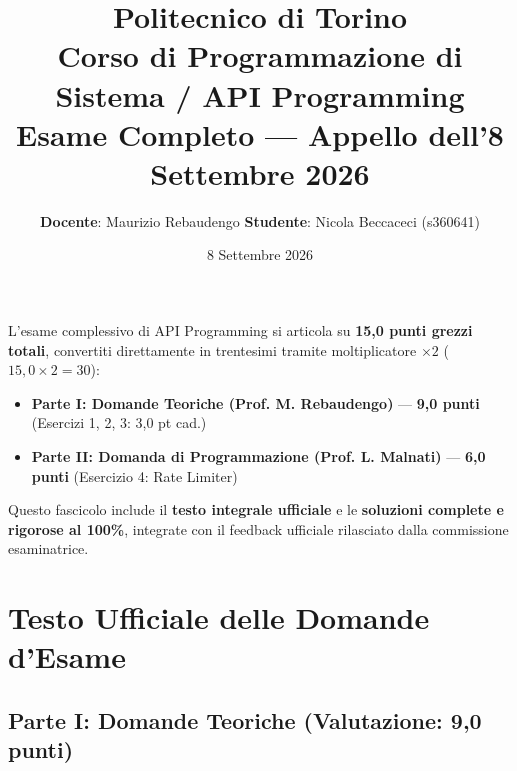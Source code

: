 \documentclass[11pt,a4paper]{article}
\title{\Huge\textbf{Politecnico di Torino}\\[0.3em]
\large Corso di Programmazione di Sistema / API Programming\\[0.5em]
\LARGE\textbf{Esame Completo --- Appello dell'8 Settembre 2026}}
\author{\textbf{Docente}: Maurizio Rebaudengo \quad \textbf{Studente}: Nicola Beccaceci (s360641)}
\date{8 Settembre 2026}
\begin{document}
\maketitle
\thispagestyle{empty}

\begin{tcolorbox}[colback=boxbg,colframe=boxborder,title=\textbf{Riepilogo Ufficiale e Struttura della Valutazione},arc=3mm]
L'esame complessivo di API Programming si articola su \textbf{15,0 punti grezzi totali}, convertiti direttamente in trentesimi tramite moltiplicatore $\times 2$ ($15{,}0 \times 2 = 30$):
\begin{itemize}[leftmargin=1.5em]
    \item \textbf{Parte I: Domande Teoriche (Prof. M. Rebaudengo)} --- \textbf{9,0 punti} (Esercizi 1, 2, 3: 3,0 pt cad.)
    \item \textbf{Parte II: Domanda di Programmazione (Prof. L. Malnati)} --- \textbf{6,0 punti} (Esercizio 4: Rate Limiter)
\end{itemize}
Questo fascicolo include il \textbf{testo integrale ufficiale} e le \textbf{soluzioni complete e rigorose al 100\%}, integrate con il feedback ufficiale rilasciato dalla commissione esaminatrice.
\end{tcolorbox}

\vspace{0.5em}
\tableofcontents
\newpage

\section{Testo Ufficiale delle Domande d'Esame}

\subsection*{Parte I: Domande Teoriche (Valutazione: 9,0 punti)}
\end{document}
